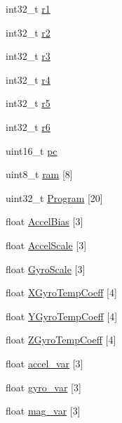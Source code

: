 \begin{DoxyCompactItemize}
\item 
int32\-\_\-t \hyperlink{struct____attribute_____ab9207ad4b7a4c8825f2026d46df45e3a}{r1}
\item 
int32\-\_\-t \hyperlink{struct____attribute_____ac9f443ec67da2191dbc6e933ff4b4a6d}{r2}
\item 
int32\-\_\-t \hyperlink{struct____attribute_____a5647d0f5d686f5c87e1c18f7f1c10991}{r3}
\item 
int32\-\_\-t \hyperlink{struct____attribute_____a330a6dc80a8c1ac0987bd8f6c0881eff}{r4}
\item 
int32\-\_\-t \hyperlink{struct____attribute_____a7cec99a426cb7f046332ac4ad5896a39}{r5}
\item 
int32\-\_\-t \hyperlink{struct____attribute_____a1a5dfb1ec102e7fad7f2ac0396b0f90b}{r6}
\item 
uint16\-\_\-t \hyperlink{struct____attribute_____acd1448632ff255cc162c89177dabd24d}{pc}
\item 
uint8\-\_\-t \hyperlink{struct____attribute_____a55beff1438552db55c1742d51d085ae4}{ram} \mbox{[}8\mbox{]}
\item 
uint32\-\_\-t \hyperlink{struct____attribute_____a622366a301b3ba106b61751866de421b}{\-Program} \mbox{[}20\mbox{]}
\item 
float \hyperlink{struct____attribute_____a810dd3340f54169547a832ce775b01dd}{\-Accel\-Bias} \mbox{[}3\mbox{]}
\item 
float \hyperlink{struct____attribute_____a9420b9badb1ef8f076118b174b36cfd4}{\-Accel\-Scale} \mbox{[}3\mbox{]}
\item 
float \hyperlink{struct____attribute_____a641633408758bb48296a0dd11ad3e1e5}{\-Gyro\-Scale} \mbox{[}3\mbox{]}
\item 
float \hyperlink{struct____attribute_____af91ec6288697b3ec56eabd2ebf855c62}{\-X\-Gyro\-Temp\-Coeff} \mbox{[}4\mbox{]}
\item 
float \hyperlink{struct____attribute_____a91783a73474e754c12caec1eee4b372d}{\-Y\-Gyro\-Temp\-Coeff} \mbox{[}4\mbox{]}
\item 
float \hyperlink{struct____attribute_____a3db1ab539d7ee25b918bf0e27ebf3f05}{\-Z\-Gyro\-Temp\-Coeff} \mbox{[}4\mbox{]}
\item 
float \hyperlink{struct____attribute_____a2cbd061fa75538d206551474df32c366}{accel\-\_\-var} \mbox{[}3\mbox{]}
\item 
float \hyperlink{struct____attribute_____acbeb3de4be2e299c95b047aa483707ce}{gyro\-\_\-var} \mbox{[}3\mbox{]}
\item 
float \hyperlink{struct____attribute_____a7f886251ed8a8f00712f5aeb0e062055}{mag\-\_\-var} \mbox{[}3\mbox{]}

\end{DoxyCompactItemize}
